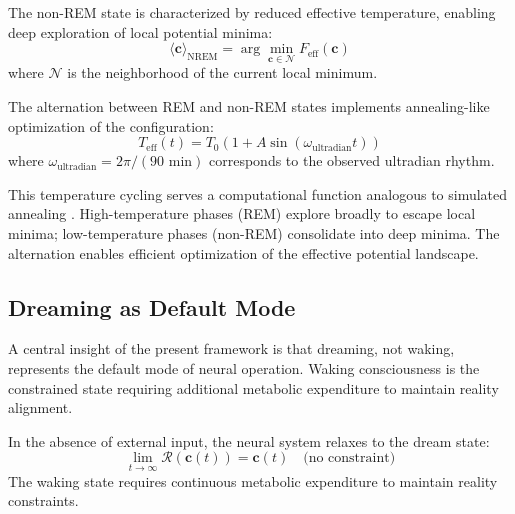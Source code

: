 \begin{definition}
\label{def:nrem_state}
The non-REM state is characterized by reduced effective temperature, enabling deep exploration of local potential minima:
\begin{equation}
\langle \mathbf{c} \rangle_{\text{NREM}} = \arg\min_{\mathbf{c} \in \mathcal{N}} F_{\text{eff}}(\mathbf{c})
\label{eq:nrem_configuration}
\end{equation}
where $\mathcal{N}$ is the neighborhood of the current local minimum.
\end{definition}

\begin{theorem}
\label{thm:sleep_architecture}
The alternation between REM and non-REM states implements annealing-like optimization of the configuration:
\begin{equation}
T_{\text{eff}}(t) = T_0 \left(1 + A \sin(\omega_{\text{ultradian}} t)\right)
\label{eq:temperature_cycle}
\end{equation}
where $\omega_{\text{ultradian}} = 2\pi / (90 \text{ min})$ corresponds to the observed ultradian rhythm.
\end{theorem}

This temperature cycling serves a computational function analogous to simulated annealing \citep{kirkpatrick1983optimization}. High-temperature phases (REM) explore broadly to escape local minima; low-temperature phases (non-REM) consolidate into deep minima. The alternation enables efficient optimization of the effective potential landscape.

\subsection{Dreaming as Default Mode}

A central insight of the present framework is that dreaming, not waking, represents the default mode of neural operation. Waking consciousness is the constrained state requiring additional metabolic expenditure to maintain reality alignment.

\begin{theorem}
\label{thm:default_state}
In the absence of external input, the neural system relaxes to the dream state:
\begin{equation}
\lim_{t \rightarrow \infty} \mathcal{R}(\mathbf{c}(t)) = \mathbf{c}(t) \quad \text{(no constraint)}
\label{eq:default_limit}
\end{equation}
The waking state requires continuous metabolic expenditure to maintain reality constraints.
\end{theorem}

